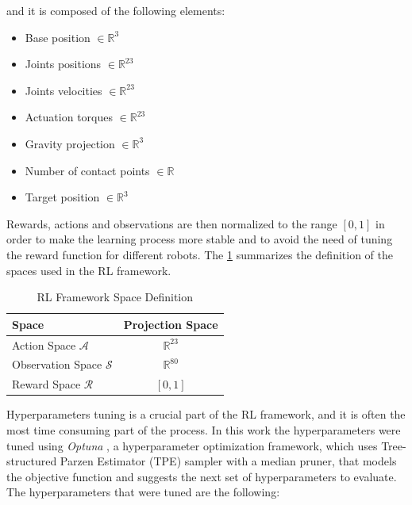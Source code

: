 and it is composed of the following elements:

\begin{itemize}
    \item Base position $\in \mathbb{R} ^{3}$
    \item Joints positions $\in \mathbb{R} ^{23}$
    \item Joints velocities $\in \mathbb{R} ^{23}$
    \item Actuation torques $\in \mathbb{R} ^{23}$
    \item Gravity projection $\in \mathbb{R} ^{3}$
    \item Number of contact points $\in \mathbb{R}$
    \item Target position $\in \mathbb{R} ^{3}$
\end{itemize}

Rewards, actions and observations are then normalized to the range $[0,1]$ in order to make the learning process more stable and to avoid the need of tuning the reward function for different robots. The \cref{tab:rlspacedef} summarizes the definition of the spaces used in the \ac{RL} framework.

\begin{table}
    \centering
    \begin{tabular}{l c}
        \toprule
        Space                           & Projection Space   \\
        \midrule
        Action Space $\mathcal{A}$      & $\mathbb{R} ^{23}$ \\
        Observation Space $\mathcal{S}$ & $\mathbb{R} ^{80}$ \\
        Reward Space $\mathcal{R}$      & $[0,1]$            \\
        \bottomrule
    \end{tabular}
    \caption{RL Framework Space Definition}
    \label{tab:rlspacedef}
\end{table}

Hyperparameters tuning is a crucial part of the \ac{RL} framework, and it is often the most time consuming part of the process. In this work the hyperparameters were tuned using \textit{Optuna} \cite{akiba_optuna_2019}, a hyperparameter optimization framework, which uses Tree-structured Parzen Estimator (\ac{TPE}) sampler with a median pruner, that models the objective function and suggests the next set of hyperparameters to evaluate. The hyperparameters that were tuned are the following:

